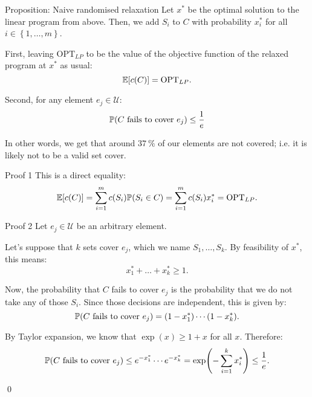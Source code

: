 \documentclass[a4paper]{article}
\begin{document}
\begin{parag}{Proposition: Naive randomised relaxation}
    Let $x^*$ be the optimal solution to the linear program from above. Then, we add $S_i$ to $C$ with probability $x_i^*$ for all $i \in \left\{1, \ldots, m\right\}$. 

    First, leaving $\text{OPT}_{LP}$ to be the value of the objective function of the relaxed program at $x^*$ as usual: 
    \[\exval\left[c\left(C\right)\right] = \text{OPT}_{LP}.\]

    Second, for any element $e_j \in \mathcal{U}$: 
    \[\prob\left(\text{$C$ fails to cover $e_j$}\right) \leq \frac{1}{e}\]

    In other words, we get that around $\SI{37}{\%}$ of our elements are not covered; i.e. it is likely not to be a valid set cover.

    \begin{subparag}{Proof 1}
        This is a direct equality: 
        \[\exval\left[c\left(C\right)\right] = \sum_{i=1}^{m} c\left(S_i\right)\prob\left(S_i \in C\right) = \sum_{i=1}^{m} c\left(S_i\right) x_i^* = \text{OPT}_{LP}.\]
    \end{subparag}

    \begin{subparag}{Proof 2}
        Let $e_j \in \mathcal{U}$ be an arbitrary element. 

        Let's suppose that $k$ sets cover $e_j$, which we name $S_1, \ldots, S_k$. By feasibility of $x^*$, this means: 
        \[x_1^* + \ldots + x_k^* \geq 1.\]
        
        Now, the probability that $C$ fails to cover $e_j$ is the probability that we do not take any of those $S_i$. Since those decisions are independent, this is given by: 
        \[\prob\left(\text{$C$ fails to cover $e_j$}\right) = \left(1- x_1^*\right) \cdots \left(1 - x_k^*\right).\]

        By Taylor expansion, we know that $\exp\left(x\right) \geq 1 + x$ for all $x$. Therefore:
        \[\prob\left(\text{$C$ fails to cover $e_j$}\right) \leq e^{- x_1^*} \cdots e^{- x_k^*} = \exp\left(- \sum_{i=1}^{k} x_i^*\right) \leq \frac{1}{e}.\]

        \qed
    \end{subparag}
\end{parag}
\end{document}
